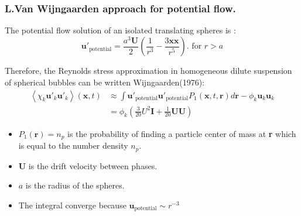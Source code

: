 \documentclass{sintefbeamer}
\newcommand{\avg}[1]{\left<#1\right>}
\newcommand{\CC}{\mathscr{C}}
\begin{document}
\begin{frame}
  \frametitle{L.Van Wijngaarden approach for potential flow.}

The potential flow solution of an isolated translating spheres is :
\begin{equation*}
  \textbf{u}'_\text{potential}
  = \frac{a^3 \textbf{U}}{2}\left(\frac{1}{r^3} - \frac{3 \textbf{xx}}{r^5}\right).
  \text{    for    }r>a
\end{equation*}

Therefore, the Reynolds stress approximation in homogeneous dilute suspension of spherical bubbles can be written Wijngaarden(1976): 
  \begin{align*}
    \avg{\chi_k \textbf{u}'_k\textbf{u}'_k}(\textbf{x},t)
    &\approx \int \textbf{u}'_\text{potential}\textbf{u}'_\text{potential}  P_1(\textbf{x},t,\textbf{r}) d\textbf{r}
    - \phi_k \textbf{u}_k\textbf{u}_k\\
    &= \phi_k \left(\frac{3}{20} U^2\textbf{I} + \frac{1}{20}\textbf{UU} \right)
\end{align*}


\begin{itemize}
  \item $P_1(\textbf{r}) = n_p$ is the probability of finding a particle center of mass at \textbf{r} which is equal to the number density $n_p$. 
  \item \textbf{U} is the drift velocity between phases. 
  \item $a$ is the radius of the spheres. 
  \item The integral converge because $\textbf{u}_\text{potential}  \sim r^{-3}$
\end{itemize}

\end{frame}
\end{document}
